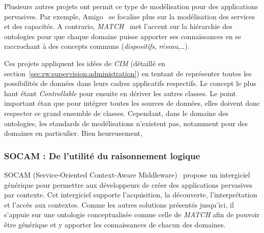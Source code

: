 Plusieurs autres projets ont permit ce type de modélisation pour des applications pervasives. Par exemple, Amigo~\cite{BenMokhtar:easy} se focalise plus sur la modélisation des services et des capacités. A contrario, \textit{MATCH}~\cite{Docherty:match} met l'accent sur la hiérarchie des ontologies pour que chaque domaine puisse apporter ses connaissances en se raccrochant à des concepts communs (\textit{dispositifs}, \textit{réseau},\dots).

Ces projets appliquent les idées de \textit{CIM} (détaillé en section~\ref{sec:rw:supervision:administration}) en tentant de représenter toutes les possibilités de données dans leurs cadres applicatifs respectifs. Le concept le plus haut étant \textit{Controllable} pour ensuite en dériver les autres classes. Le point important étan que pour intégrer toutes les sources de données, elles doivent donc respecter ce grand ensemble de classes. Cependant, dans le domaine des ontologies, les standards de modélisations n'existent pas, notamment pour des domaines en particulier. Bien heureusement, 

\subsubsection{SOCAM : De l'utilité du raisonnement logique}
SOCAM (Service-Oriented Context-Aware Middleware)~\cite{Gu:socam} propose un intergiciel générique pour permettre aux développeurs de créer des applications pervasives par contexte. Cet intergiciel supporte l'acquisition, la découverte, l'interprétation et l'accès aux contextes. Comme les autres solutions présentés jusqu'ici, il s'appuie sur une ontologie conceptualisée comme celle de \textit{MATCH} afin de pouvoir être générique et y apporter les connaissances de chacun des domaines.

